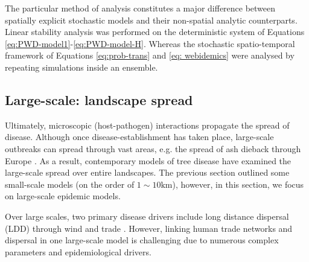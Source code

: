 The particular method of analysis constitutes a major difference between spatially explicit stochastic models 
and their non-spatial analytic counterparts. Linear stability analysis was performed on the deterministic system
of Equations \ref{eq:PWD-model1}-\ref{eq:PWD-model-H}. Whereas the stochastic spatio-temporal framework of Equations
\ref{eq:prob-trans} and \ref{eq: webidemics} were analysed by repeating simulations inside an ensemble.

\subsection{Large-scale: landscape spread}
\label{sec:lr-large-scale-spread}

Ultimately, microscopic (host-pathogen) interactions propagate the spread of disease. 
Although once disease-establishment has taken place, large-scale outbreaks can spread through vast
areas, e.g. the spread of ash dieback through Europe \cite{alsop2015ash}.
As a result, contemporary models of tree disease have examined the large-scale spread over entire landscapes.
The previous section outlined some small-scale models (on the order of $1 \sim 10 \mathrm{km}$), 
however, in this section, we focus on large-scale epidemic models.

Over large scales, two primary disease drivers include long distance dispersal (LDD) through wind \cite{golan2017long, gross2014h} and
trade \cite{ash-dieback-costs, perrings2016options, harwood2009epidemiological, doi:10.1098/rsif.2005.0051}.
However, linking human trade networks and dispersal in one large-scale model is challenging due to numerous complex parameters 
and epidemiological drivers. 

